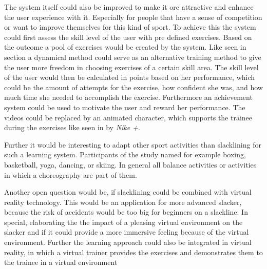 The system itself could also be improved to make it ore attractive and enhance the user experience with it.
Especially for people that have a sense of competition or want to improve themselves for this kind of sport. 
To achieve this the system could first assess the skill level of the user with pre defined exercises.
Based on the outcome a pool of exercises would be created by the system.
Like seen in section  a dynamical method could serve as an alternative training method to give the user more freedom in choosing exercises of a certain skill area.
The skill level of the user would then be calculated in points based on her performance, which could be the amount of attempts for the exercise, how confident she was, and how much time she needed to accomplish the exercise.
Furthermore an achievement system could be used to motivate the user and reward her performance.
The videos could be replaced by an animated character, which supports the trainee during the exercises like seen in  by \textit{Nike +}.

Further it would be interesting to adapt other sport activities than slacklining for such a learning system.
Participants of the study named for example boxing, basketball, yoga, dancing, or skiing.
In general all balance activities or activities in which a choreography are part of them.

Another open question would be, if slacklining could be combined with virtual reality technology.
This would be an application for more advanced slacker, because the risk of accidents would be too big for beginners on a slackline.
In special, elaborating the the impact of a pleasing virtual environment on the slacker and if it could provide a more immersive feeling because of the virtual environment.
Further the learning approach could also be integrated in virtual reality, in which a virtual trainer provides the exercises and demonstrates them to the trainee in a virtual environment

% 


